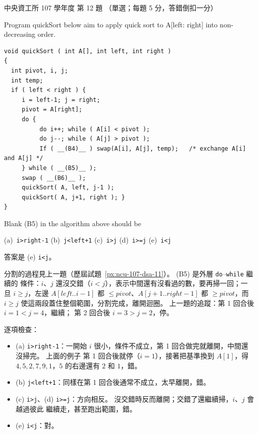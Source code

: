 \begin{pastexam}[label={px:ncu-107-dsa-12}]{中央資工所 107 學年度 第 12 題}
（單選；每題 5 分，答錯倒扣一分）

Program quickSort below aim to apply quick sort to A[left: right] into non-decreasing order.
\begin{verbatim}
void quickSort ( int A[], int left, int right )
{
  int pivot, i, j;
  int temp;
  if ( left < right ) {
     i = left-1; j = right;
     pivot = A[right];
     do {
          do i++; while ( A[i] < pivot );
          do j--; while ( A[j] > pivot );
          If ( __(B4)__ ) swap(A[i], A[j], temp);   /* exchange A[i] and A[j] */
     } while ( __(B5)__ );
     swap ( __(B6)__ );
     quickSort( A, left, j-1 );
     quickSort( A, j+1, right ); }
}
\end{verbatim}

Blank (B5) in the algorithm above should be

(a)~\texttt{i>right-1} \qquad (b)~\texttt{j<left+1} \qquad (c)~\texttt{i>j} \qquad (d)~\texttt{i>=j} \qquad (e)~\texttt{i<j}
\end{pastexam}

\begin{pastsoln}
答案是 (e) \texttt{i<j}。

分割的過程見上一題（歷屆試題~\ref{px:ncu-107-dsa-11}）。 (B5) 是外層 \texttt{do}--\texttt{while} 繼續的
條件：$i$、$j$ 還沒交錯（$i < j$），表示中間還有沒看過的數，要再掃一回；一旦 $i \ge j$，左邊
$A[\mathit{left}..i-1]$ 都 $\le \mathit{pivot}$、$A[j+1..\mathit{right}-1]$ 都 $\ge \mathit{pivot}$，而
$i \ge j$ 使這兩段蓋住整個範圍，分割完成，離開迴圈。 上一題的追蹤：第 1 回合後 $i = 1 < j = 4$，繼續；
第 2 回合後 $i = 3 > j = 2$，停。

逐項檢查：
\begin{itemize}
\item (a) \texttt{i>right-1}：一開始 $i$ 很小，條件不成立，第 1 回合做完就離開，中間還沒掃完。 上面的例子
第 1 回合後就停（$i = 1$），接著把基準換到 $A[1]$，得 $4, 5, 2, 7, 9, 1$，$5$ 的右邊還有 $2$ 和 $1$，錯。
\item (b) \texttt{j<left+1}：同樣在第 1 回合後通常不成立，太早離開，錯。
\item (c) \texttt{i>j}、(d) \texttt{i>=j}：方向相反。 沒交錯時反而離開；交錯了還繼續掃，$i$、$j$ 會越過彼此
繼續走，甚至跑出範圍，錯。
\item (e) \texttt{i<j}：對。
\end{itemize}
\end{pastsoln}
